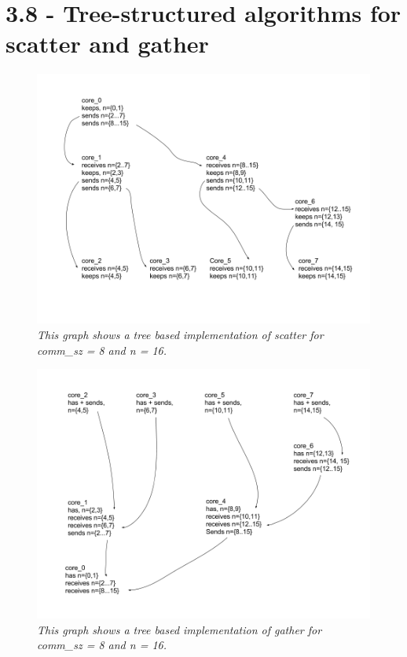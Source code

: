 \documentclass[a4paper,11pt,twoside]{article}
\begin{document}
\section{3.8 - Tree-structured algorithms for scatter and gather}
\begin{figure}

  \centering
  \includegraphics[width=1\textwidth]{scatter.png}
  \caption{\textit{This graph shows a tree based implementation of scatter for comm\_sz = 8 and n = 16.}}
  \label{fig:scatter}
\end{figure}
\begin{figure}

  \centering
  \includegraphics[width=1\textwidth]{gather.png}
  \caption{\textit{This graph shows a tree based implementation of gather for comm\_sz = 8 and n = 16.}}
  \label{fig:gather}
\end{figure}
\end{document}
